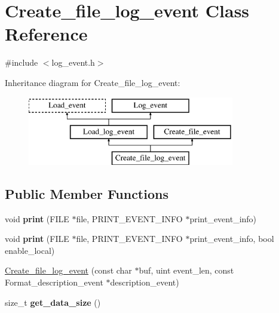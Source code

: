 \hypertarget{classCreate__file__log__event}{}\section{Create\+\_\+file\+\_\+log\+\_\+event Class Reference}
\label{classCreate__file__log__event}


{\ttfamily \#include $<$log\+\_\+event.\+h$>$}

Inheritance diagram for Create\+\_\+file\+\_\+log\+\_\+event\+:\begin{figure}[H]
\begin{center}
\leavevmode
\includegraphics[height=3.000000cm]{classCreate__file__log__event}
\end{center}
\end{figure}
\subsection*{Public Member Functions}
\begin{DoxyCompactItemize}
\item 
\mbox{\label{classCreate__file__log__event_adaba877609a7d8e19bd9a9d9b3b58c69}} 
void {\bfseries print} (F\+I\+LE $\ast$file, P\+R\+I\+N\+T\+\_\+\+E\+V\+E\+N\+T\+\_\+\+I\+N\+FO $\ast$print\+\_\+event\+\_\+info)
\item 
\mbox{\label{classCreate__file__log__event_a5c0ab1da8d0099881b9749ed640147b1}} 
void {\bfseries print} (F\+I\+LE $\ast$file, P\+R\+I\+N\+T\+\_\+\+E\+V\+E\+N\+T\+\_\+\+I\+N\+FO $\ast$print\+\_\+event\+\_\+info, bool enable\+\_\+local)
\item 
\mbox{\hyperlink{classCreate__file__log__event_a88cc18c97980807dfdd4ffd6542bbc89}{Create\+\_\+file\+\_\+log\+\_\+event}} (const char $\ast$buf, uint event\+\_\+len, const Format\+\_\+description\+\_\+event $\ast$description\+\_\+event)
\item 
\mbox{\label{classCreate__file__log__event_ac425a362eed59492a04dd0e700d61919}} 
size\+\_\+t {\bfseries get\+\_\+data\+\_\+size} ()
\end{DoxyCompactItemize}
